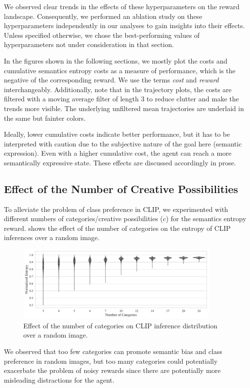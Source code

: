 We observed clear trends in the effects of these hyperparameters on the reward landscape.
Consequently, we performed an ablation study on these hyperparameters independently in our analyses to gain insights into their effects.
Unless specified otherwise, we chose the best-performing values of hyperparameters not under consideration in that section.

In the figures shown in the following sections, we mostly plot the costs and cumulative semantics entropy costs as a measure of performance, which is the negative of the corresponding reward.
We use the terms \emph{cost} and \emph{reward} interchangeably.
Additionally, note that in the trajectory plots, the costs are filtered with a moving average filter of length \(3\) to reduce clutter and make the trends more visible.
The underlying unfiltered mean trajectories are underlaid in the same but fainter colors.

Ideally, lower cumulative costs indicate better performance, but it has to be interpreted with caution due to the subjective nature of the goal here (semantic expression). Even with a higher cumulative cost, the agent can reach a more semantically expressive state.
These effects are discussed accordingly in prose.


\subsection{Effect of the Number of Creative Possibilities}
\label{sec:clip-categories}
To alleviate the problem of class preference in CLIP, we experimented with different numbers of categories/creative possibilities (\(c\)) for the semantics entropy reward.
 shows the effect of the number of categories on the entropy of CLIP inferences over a random image.

\begin{figure}[H]
    \centering
    \includegraphics[width=0.9\textwidth]{images/category_comparison_tangram.pdf}
    \caption{Effect of the number of categories on CLIP inference distribution over a random image.}
    \label{fig:clip-categories}
\end{figure}
\vspace{-7pt}
We observed that too few categories can promote semantic bias and class preference in random images, but too many categories could potentially exacerbate the problem of noisy rewards since there are potentially more misleading distractions for the agent.

